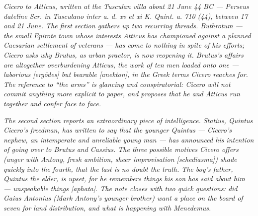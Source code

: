 
\textit{Cicero to Atticus, written at the Tusculan villa about
21 June 44 BC --- Perseus dateline \textit{Scr. in Tusculano
inter a. d. xv et xi K. Quint. a. 710 (44)}, between 17 and 21
June. The first section gathers up two recurring threads.
Buthrotum --- the small Epirote town whose interests Atticus
has championed against a planned Caesarian settlement of
veterans --- has come to nothing in spite of his efforts;
Cicero asks why Brutus, as urban praetor, is now reopening it.
Brutus's affairs are altogether overburdening Atticus, the work
of ten men loaded onto one --- laborious
\textit{[erg\=odes]} but bearable
\textit{[anekton]}, in the Greek terms Cicero reaches for.
The reference to ``the arms'' is glancing and conspiratorial:
Cicero will not commit anything more explicit to paper, and
proposes that he and Atticus run together and confer face to
face.}

\textit{The second section reports an extraordinary piece of
intelligence. Statius, Quintus Cicero's freedman, has written
to say that the younger Quintus --- Cicero's nephew, an
intemperate and unreliable young man --- has announced his
intention of going over to Brutus and Cassius. The three
possible motives Cicero offers (anger with Antony, fresh
ambition, sheer improvisation
\textit{[schediasma]}) shade quickly into the fourth, that the
last is no doubt the truth. The boy's father, Quintus the
elder, is upset, for he remembers things his son has said about
him --- unspeakable things \textit{[aphata]}. The note closes
with two quick questions: did Gaius Antonius (Mark Antony's
younger brother) want a place on the board of seven for land
distribution, and what is happening with Menedemus.}
